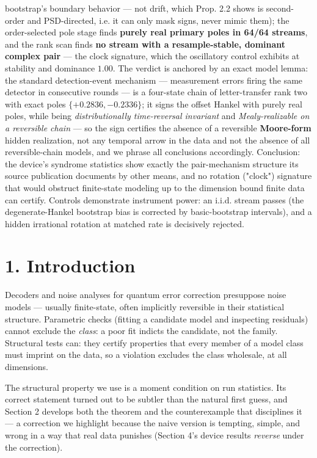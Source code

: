 \documentclass[11pt]{article}
\begin{document}
bootstrap's boundary behavior — not drift, which Prop. 2.2 shows is second-order and PSD-directed, i.e. it can only mask signs, never mimic them); the order-selected pole stage finds \textbf{purely real primary poles in 64/64 streams}, and the rank scan finds \textbf{no stream with a resample-stable, dominant complex pair} — the clock signature, which the oscillatory control exhibits at stability and dominance $1.00$.  The verdict is anchored by an exact model lemma: the standard detection-event mechanism — measurement errors firing the same detector in consecutive rounds — is a four-state chain of letter-transfer rank two with exact poles $\{+0.2836, -0.2336\}$; it signs the offset Hankel with purely real poles, while being \emph{distributionally time-reversal invariant} and \emph{Mealy-realizable on a reversible chain} — so the sign certifies the absence of a reversible \textbf{Moore-form} hidden realization, not any temporal arrow in the data and not the absence of all reversible-chain models, and we phrase all conclusions accordingly.  Conclusion: the device's syndrome statistics show exactly the pair-mechanism structure its source publication documents by other means, and no rotation ("clock") signature that would obstruct finite-state modeling up to the dimension bound finite data can certify. Controls demonstrate instrument power: an i.i.d. stream passes (the degenerate-Hankel bootstrap bias is corrected by basic-bootstrap intervals), and a hidden irrational rotation at matched rate is decisively rejected.

\section*{1. Introduction}
Decoders and noise analyses for quantum error correction presuppose noise models — usually finite-state, often implicitly reversible in their statistical structure.  Parametric checks (fitting a candidate model and inspecting residuals) cannot exclude the \emph{class}: a poor fit indicts the candidate, not the family.  Structural tests can: they certify properties that every member of a model class must imprint on the data, so a violation excludes the class wholesale, at all dimensions.

The structural property we use is a moment condition on run statistics.  Its correct statement turned out to be subtler than the natural first guess, and Section 2 develops both the theorem and the counterexample that disciplines it — a correction we highlight because the naive version is tempting, simple, and wrong in a way that real data punishes (Section 4's device results \emph{reverse} under the correction).
\end{document}
